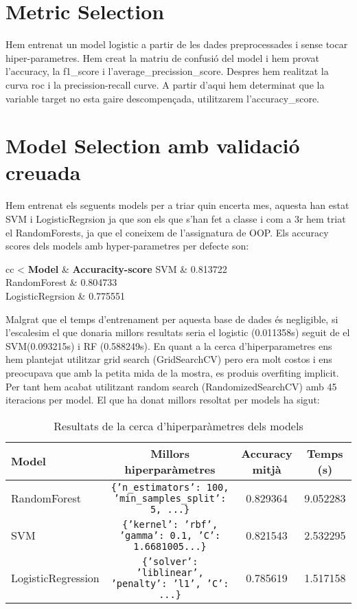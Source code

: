\documentclass[9pt,a4paper,twoside]{tau-class/tau}
\begin{document}
\section{Metric Selection}
    Hem entrenat un model logistic a partir de les dades preprocessades i sense tocar hiper-parametres.
    Hem creat la matriu de confusió del model i hem provat l'accuracy, la f1_score i l'average_precission_score.
    Despres hem realitzat la curva roc i la precission-recall curve. A partir d'aqui hem determinat que la variable target no esta gaire descompençada, 
    utilitzarem l'accuracy_score.

\section{Model Selection amb validació creuada}
    Hem entrenat els seguents models per a triar quin encerta mes, aquesta han estat SVM i LogisticRegrsion ja que son els que s'han fet a classe i com a 3r hem triat el RandomForests, ja que el coneixem de l'assignatura de OOP.
    Els accuracy scores dels models amb hyper-parametres per defecte son:
\begin{table}[H]
		\centering
		\caption{Etiquetes de Pclass}
		\label{tab:table}
		\begin{tabular}{cc}
<			\toprule
			\textbf{Model} & \textbf{Accuracity-score}
			\midrule
			SVM & 0.813722\\
            RandomForest & 0.804733\\
            LogisticRegrsion & 0.775551\\
            \bottomrule
		\end{tabular}			
	\end{table}
    Malgrat que el temps d'entrenament per aquesta base de dades és negligible, si l'escalesim el que donaria millors resultats seria el logistic (0.011358s) seguit de el SVM(0.093215s) i RF (0.588249s).
    En quant a la cerca d'hiperparametres ens hem plantejat utilitzar grid search (GridSearchCV) pero era molt costos i ens preocupava que amb la petita mida de la mostra, es produis overfiting implicit. Per tant hem acabat utilitzant random search (RandomizedSearchCV) amb 45 iteracions per model.
    El que ha donat millors resoltat per models ha sigut:
\begin{table}[H]
    \centering
    \caption{Resultats de la cerca d'hiperparàmetres dels models}
    \label{tab:hiperparametres}
    \begin{tabular}{lccc}
        \toprule
        \textbf{Model} & \textbf{Millors hiperparàmetres} & \textbf{Accuracy mitjà} & \textbf{Temps (s)} \\
        \midrule
        RandomForest & \texttt{\{'n\_estimators': 100, 'min\_samples\_split': 5, ...\}} & 0.829364 & 9.052283 \\
        SVM & \texttt{\{'kernel': 'rbf', 'gamma': 0.1, 'C': 1.6681005...\}} & 0.821543 & 2.532295 \\
        LogisticRegression & \texttt{\{'solver': 'liblinear', 'penalty': 'l1', 'C': ...\}} & 0.785619 & 1.517158 \\
        \bottomrule
    \end{tabular}
\end{table}
\end{document}
